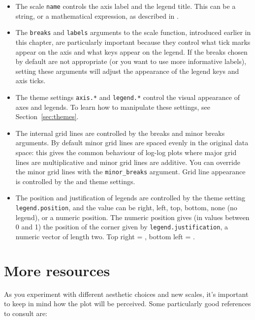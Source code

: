 \begin{itemize}
  \item The scale {\tt name} controls the axis label and the legend title.  This can be a string, or a mathematical expression, as described in .
  
  \item The {\tt breaks} and {\tt labels} arguments to the scale function, introduced earlier in this chapter, are particularly important because they control what tick marks appear on the axis and what keys appear on the legend.  If the breaks chosen by default are not appropriate (or you want to use more informative labels), setting these arguments will adjust the appearance of the legend keys and axis ticks.  
  
  \item The theme settings {\tt axis.*} and {\tt legend.*} control the visual appearance of axes and legends.  To learn how to manipulate these settings, see Section~\ref{sec:themes}.

  \item The internal grid lines are controlled by the breaks and minor breaks arguments.  By default minor grid lines are spaced evenly in the original data space: this gives the common behaviour of log-log plots where major grid lines are multiplicative and minor grid lines are additive.  You can override the minor grid lines with the {\tt minor\_breaks} argument.  Grid line appearance is controlled by the  and  theme settings. 

  \item The position and justification of legends are controlled by the theme setting {\tt legend.position}, and the value can be right, left, top, bottom, none (no legend), or a numeric position.  The numeric position gives (in values between 0 and 1) the position of the corner given by {\tt legend.justification}, a numeric vector of length two.  Top right = , bottom left = . 
  
\end{itemize}

\section{More resources}
\label{sec:scale-resources}

As you experiment with different aesthetic choices and new scales, it's important to keep in mind how the plot will be perceived.   Some particularly good references to consult are:

